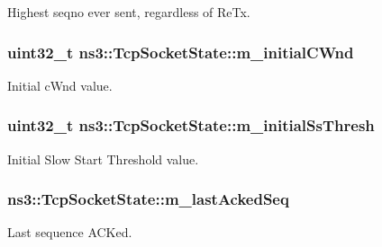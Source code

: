 Highest seqno ever sent, regardless of Re\+Tx. 

\subsubsection[{\texorpdfstring{m\+\_\+initial\+C\+Wnd}{m_initialCWnd}}]{\setlength{\rightskip}{0pt plus 5cm}uint32\+\_\+t ns3\+::\+Tcp\+Socket\+State\+::m\+\_\+initial\+C\+Wnd}\hypertarget{classns3_1_1TcpSocketState_a89931823b979729b749d93d34de9dc10}{}\label{classns3_1_1TcpSocketState_a89931823b979729b749d93d34de9dc10}


Initial c\+Wnd value. 

\subsubsection[{\texorpdfstring{m\+\_\+initial\+Ss\+Thresh}{m_initialSsThresh}}]{\setlength{\rightskip}{0pt plus 5cm}uint32\+\_\+t ns3\+::\+Tcp\+Socket\+State\+::m\+\_\+initial\+Ss\+Thresh}\hypertarget{classns3_1_1TcpSocketState_a32bb44dd7042e9ee25b5869a5a49e0bb}{}\label{classns3_1_1TcpSocketState_a32bb44dd7042e9ee25b5869a5a49e0bb}


Initial Slow Start Threshold value. 

\subsubsection[{\texorpdfstring{m\+\_\+last\+Acked\+Seq}{m_lastAckedSeq}}]{ ns3\+::\+Tcp\+Socket\+State\+::m\+\_\+last\+Acked\+Seq}\hypertarget{classns3_1_1TcpSocketState_a7a30ba2b675238429c7fe2f0c8d1ce94}{}\label{classns3_1_1TcpSocketState_a7a30ba2b675238429c7fe2f0c8d1ce94}


Last sequence A\+C\+Ked. 

